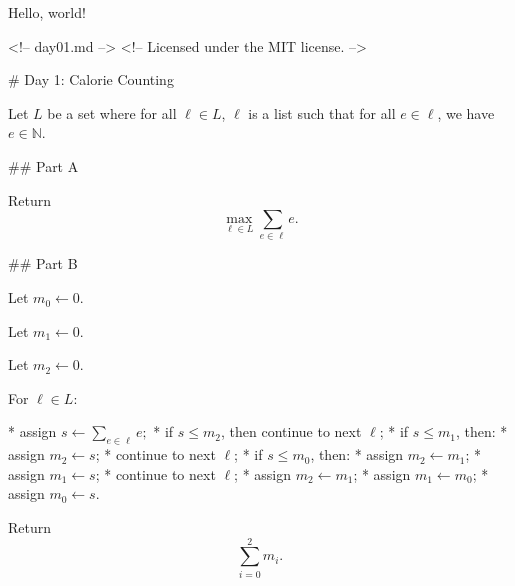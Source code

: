 \documentclass{article}
\begin{document}
Hello, world!
\begin{code}
<!-- day01.md -->
<!-- Licensed under the MIT license. -->

# Day 1: Calorie Counting

Let $L$ be a set where for all $\ell\in L$, $\ell$ is a list such that for all
$e\in\ell$, we have $e\in\mathbb{N}$.

## Part A

Return
$$\underset{\ell\in L}{\max}\sum_{e\in\ell}e.$$

## Part B

Let $m_0\leftarrow 0$.

Let $m_1\leftarrow 0$.

Let $m_2\leftarrow 0$.

For $\ell\in L$:

* assign $s\leftarrow\sum_{e\in\ell}e;$
* if $s\leq m_2$, then continue to next $\ell$;
* if $s\leq m_1$, then:
  * assign $m_2\leftarrow s$;
  * continue to next $\ell$;
* if $s\leq m_0$, then:
  * assign $m_2\leftarrow m_1$;
  * assign $m_1\leftarrow s$;
  * continue to next $\ell$;
* assign $m_2\leftarrow m_1$;
* assign $m_1\leftarrow m_0$;
* assign $m_0\leftarrow s$.

Return
$$\sum_{i=0}^2{m_i}.$$
\end{code}
\end{document}
